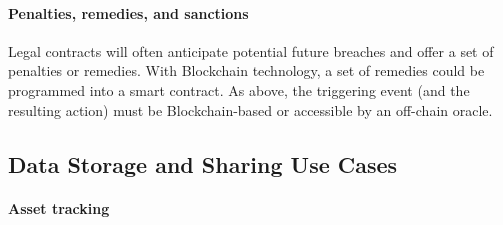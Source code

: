 

\paragraph{Penalties, remedies, and sanctions}

Legal contracts will often anticipate potential future breaches and offer a set of penalties or remedies.
With Blockchain technology, a set of remedies could be programmed into a smart 
contract. As above, the triggering event (and the resulting action) must be 
Blockchain-based or accessible by an off-chain oracle.


\subsection{Data Storage and Sharing Use Cases}

\paragraph{Asset tracking} 

